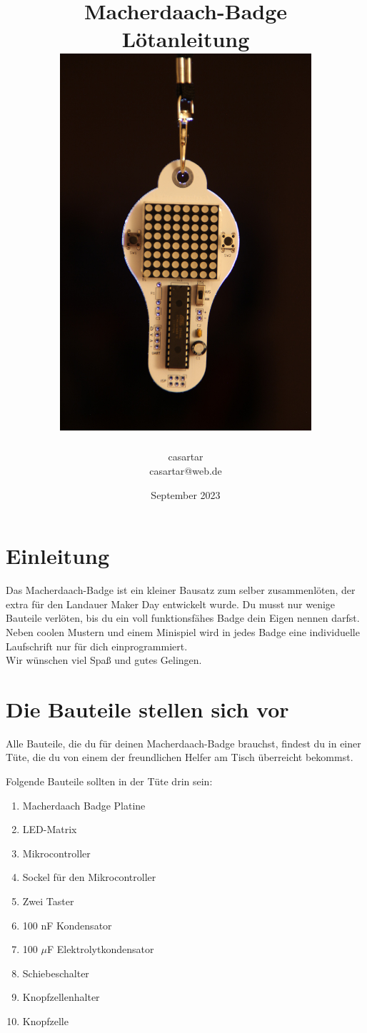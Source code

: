 \documentclass{article}
\title{Macherdaach-Badge \\ Lötanleitung \\ [1cm]
\includegraphics[width=0.7\textwidth, angle=90]{Bilder2023/IMG_8403.JPG}
}
\date{September 2023}
\author{casartar\\casartar@web.de}
\begin{document}
\maketitle
\newpage
\section{Einleitung}

Das Macherdaach-Badge ist ein kleiner Bausatz zum selber zusammenlöten, der extra für den Landauer Maker Day entwickelt wurde.
Du musst nur wenige Bauteile verlöten, bis du ein voll funktionsfähes Badge dein Eigen nennen darfst. Neben coolen Mustern und einem Minispiel wird in jedes Badge eine individuelle Laufschrift nur für dich einprogrammiert.\\

Wir wünschen viel Spaß und gutes Gelingen. 

\section{Die Bauteile stellen sich vor}
Alle Bauteile, die du für deinen Macherdaach-Badge brauchst, findest du in einer Tüte, die du von einem der freundlichen Helfer am Tisch überreicht bekommst.

Folgende Bauteile sollten in der Tüte drin sein:

\begin{enumerate}
	\item Macherdaach Badge Platine
	\item LED-Matrix
	\item Mikrocontroller
	\item Sockel für den Mikrocontroller
	\item Zwei Taster
	\item 100 nF Kondensator
	\item 100 $\mu$F Elektrolytkondensator
	\item Schiebeschalter
	\item Knopfzellenhalter
	\item Knopfzelle
\end{enumerate}

\newpage
\end{document}
